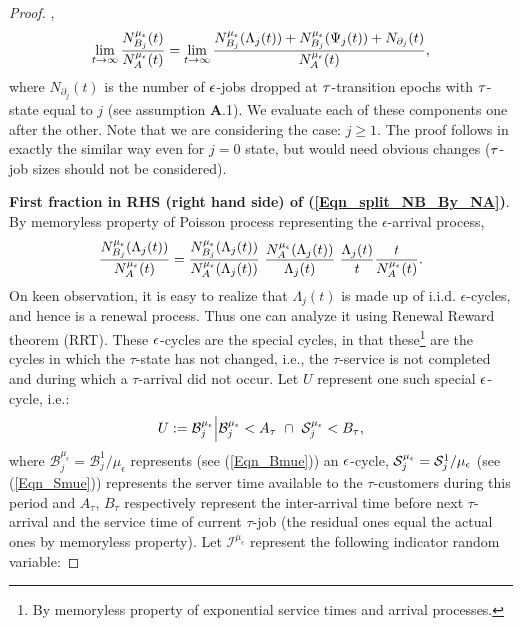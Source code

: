 \begin{proof}
{},
\begin{eqnarray}
\lim _{t \to \infty } \frac{N_{B_j}^{\mue}(t)}{N_A^{\mue}(t)}
% 
= \lim _{t \to \infty } \frac{  N_{B_j}^{\mue}(\Lambda_{j}(t)) + N_{B_j}^{\mue}( \Psi_{j} (t))  + N_{\partial_j} (t) }{N_A^{\mue}(t)} ,
\label{Eqn_split_NB_By_NA}
\end{eqnarray}where $N_{\partial_j} (t)$ is the number of $\i$-jobs dropped at  $\t$-transition epochs with $\t$-state equal to $j$ (see   assumption {\bf A}.1). 
We evaluate each of these components one after the other.  
{Note that we are considering the case: $j \geq 1$. The proof follows in exactly the similar way even for $j = 0$ state, but would need  obvious changes ($\t$-job sizes should not be considered).}
 
{\bf First fraction   in  RHS  (right hand side) of  (\ref{Eqn_split_NB_By_NA})}. By memoryless property of Poisson process representing the $\epsilon$-arrival process, 
\begin{eqnarray}
\label{Eqn_split_1}
\frac{ N_{B_j}^{\mue}(\Lambda_{j}(t))}{N_A^{\mue}(t)}  = \frac{ N_{B_j}^{\mue}(\Lambda_{j}(t))}{N_{A}^{\mue}(\Lambda_{j}(t))} \
\frac{ N_{A}^{\mue}(\Lambda_{j}(t))}{ \Lambda_{j}(t)}  \   \frac{ \Lambda_{j}(t)}{t}  \frac{t}{N_A^{\mue}(t)}.
\end{eqnarray}
On keen observation, it is easy to realize that $\Lambda_{j}(t) $ is made up of i.i.d. $\epsilon$-cycles, and hence is a renewal process. Thus one can analyze it using Renewal Reward theorem (RRT). These $\i$-cycles are the special cycles,   in that these\footnote{By memoryless property of exponential service times and arrival processes.}  are the   
cycles in which the $\tau$-state has not changed, i.e.,  the $\tau$-service is not completed and during which a $\tau$-arrival did not occur.  Let 
$U$ represent      one such  special $\i$-cycle, i.e.:
\begin{eqnarray}
\label{Eqn_special_cycle}
U :=  {\mathcal  B}_j^{\mu_\epsilon}  \Big |   
{\mathcal  B}_j^{\mu_\epsilon}  <  A_\tau  \ \cap \ \S^{\mu_\epsilon}_j  <   B_\tau,  
\end{eqnarray} 
where 
${\mathcal  B}_j^{\mu_\epsilon} = {\mathcal  B}_j^1 / \mu_\epsilon$ represents  (see (\ref{Eqn_Bmue})) 
an $\i$-cycle,    
$
\S^{\mu_\epsilon}_j  =  \S^1_j / {\mu_\epsilon} 
$ (see (\ref{Eqn_Smue})) represents the server time available to the $\tau$-customers during this period and  $A_\tau$, $ B_\tau $  respectively represent the inter-arrival time before next $\tau$-arrival and the service time of current $\tau$-job (the residual ones equal the actual ones by memoryless property).  Let ${\mathcal I}^{\mu_\epsilon}$ represent the following indicator random variable:

\end{proof}
